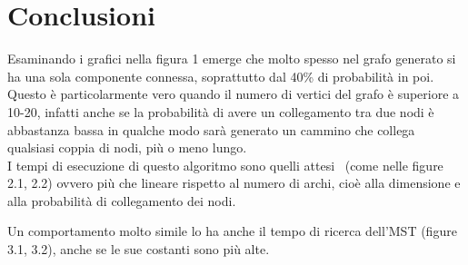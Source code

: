 \documentclass[
]{article}
\begin{document}
\hypertarget{conclusioni}{%
\section{Conclusioni}\label{conclusioni}}

Esaminando i grafici nella figura 1 emerge che molto spesso nel
grafo generato si ha una sola componente connessa, soprattutto dal 40\%
di probabilità in poi.\\
Questo è particolarmente vero quando il numero di vertici del grafo è
superiore a 10-20, infatti anche se la probabilità di avere un
collegamento tra due nodi è abbastanza bassa in qualche modo sarà
generato un cammino che collega qualsiasi coppia di nodi, più o meno
lungo.\\
I tempi di esecuzione di questo algoritmo sono quelli attesi \ (come nelle
figure 2.1, 2.2) ovvero più che lineare rispetto al numero di archi,
cioè alla dimensione e alla probabilità di collegamento dei nodi.

Un comportamento molto simile lo ha anche il tempo di ricerca
dell'MST (figure 3.1, 3.2), anche se le sue costanti sono più alte.
\end{document}
